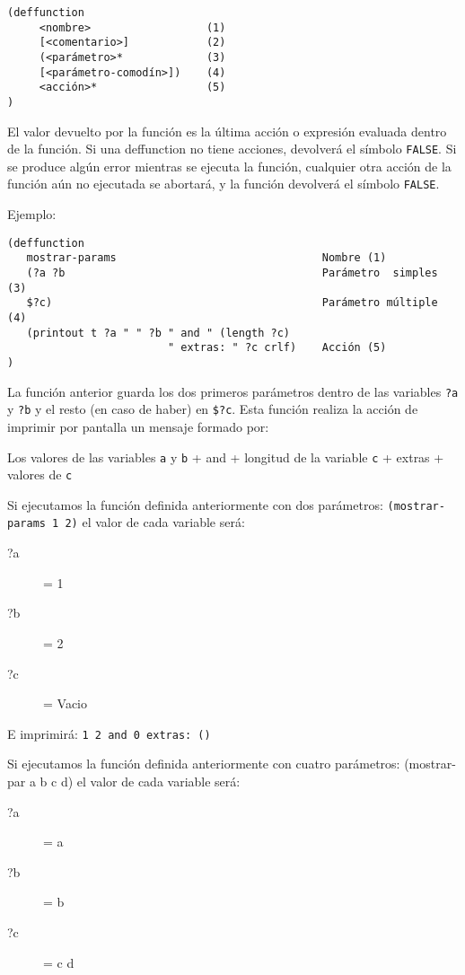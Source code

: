 \documentclass[11pt,svgnames]{scrbook}
\begin{document}
\begin{verbatim}
(deffunction
     <nombre>                  (1)
     [<comentario>]            (2)
     (<parámetro>*             (3)
     [<parámetro-comodín>])    (4)
     <acción>*                 (5)
)
\end{verbatim}

El valor devuelto por la función es la última acción o expresión evaluada dentro
de la función.  Si una deffunction no tiene acciones, devolverá el símbolo
\texttt{FALSE}. Si se produce algún error mientras se ejecuta la función,
cualquier otra acción de la función aún no ejecutada se abortará, y la función
devolverá el símbolo \texttt{FALSE}.

Ejemplo:

\begin{verbatim}
(deffunction
   mostrar-params                                Nombre (1)
   (?a ?b                                        Parámetro  simples (3)
   $?c)                                          Parámetro múltiple  (4)
   (printout t ?a " " ?b " and " (length ?c)
                         " extras: " ?c crlf)    Acción (5)
)\end{verbatim}

La función anterior guarda los dos primeros parámetros dentro de las variables
\texttt{?a} y \texttt{?b} y el resto (en caso de haber) en \texttt{\$?c}. Esta función realiza la
acción de imprimir por pantalla un mensaje formado por:

    Los valores de las variables \texttt{a} y \texttt{b}  +  and + longitud de la variable
\texttt{c} + extras + valores de \texttt{c}

Si  ejecutamos la función definida anteriormente con dos parámetros:
\texttt{(mostrar-params 1 2)} el valor de cada variable será:
\begin{description}
 \item[?a]= 1
\item[?b]= 2
\item [?c]= Vacio
 \end{description}



E imprimirá: \texttt{1 2 and 0 extras: ()}

Si  ejecutamos la función definida anteriormente con cuatro parámetros:
(mostrar-par a b c d) el valor de cada variable será:

\begin{description}
 \item[?a]= a
\item[?b]= b
\item [?c]= c d
 \end{description}
\end{document}
